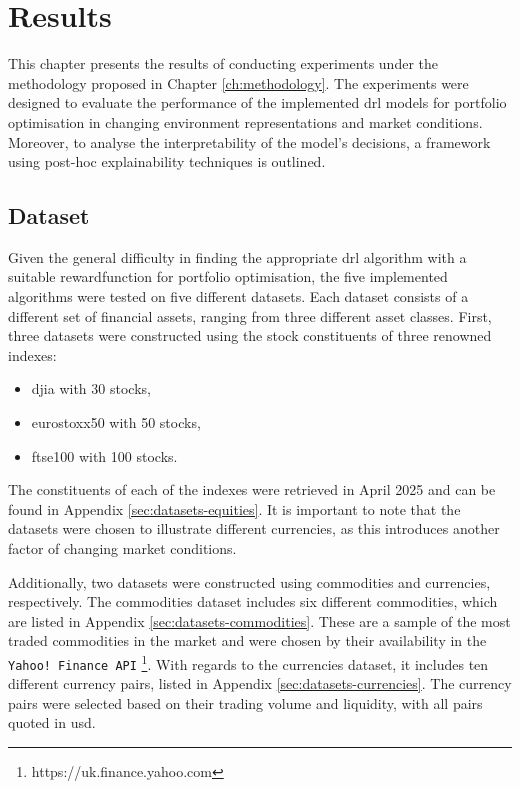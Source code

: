 \chapter{Results} \label{ch:results}

This chapter presents the results of conducting experiments under the methodology proposed in Chapter \ref{ch:methodology}. The experiments were designed to evaluate the performance of the implemented \acrshort{drl} models for portfolio optimisation in changing environment representations and market conditions. Moreover, to analyse the interpretability of the model's decisions, a framework using post-hoc explainability techniques is outlined.

\section{Dataset} \label{sec:dataset}

Given the general difficulty in finding the appropriate \acrshort{drl} algorithm with a suitable \gls{rewardfunction} for portfolio optimisation, the five implemented algorithms were tested on five different datasets. Each dataset consists of a different set of financial assets, ranging from three different asset classes. First, three datasets were constructed using the stock constituents of three renowned indexes:
\begin{itemize}
    \item \acrfull{djia} with 30 stocks,
    \item \acrfull{eurostoxx50} with 50 stocks,
    \item \acrfull{ftse100} with 100 stocks.
\end{itemize}

The constituents of each of the indexes were retrieved in April 2025 and can be found in Appendix \ref{sec:datasets-equities}. It is important to note that the datasets were chosen to illustrate different currencies, as this introduces another factor of changing market conditions. 

Additionally, two datasets were constructed using commodities and currencies, respectively. The commodities dataset includes six different commodities, which are listed in Appendix \ref{sec:datasets-commodities}. These are a sample of the most traded commodities in the market and were chosen by their availability in the \texttt{Yahoo! Finance API} \footnote{https://uk.finance.yahoo.com}. With regards to the currencies dataset, it includes ten different currency pairs, listed in Appendix \ref{sec:datasets-currencies}. The currency pairs were selected based on their trading volume and liquidity, with all pairs quoted in \acrfull{usd}.

